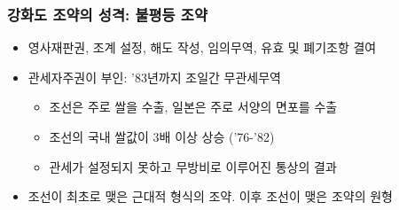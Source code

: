 \subsubsection*{강화도 조약의 성격: 불평등 조약}
\begin{itemize}
    \item 영사재판권, 조계 설정, 해도 작성, 임의무역, 유효 및 폐기조항 결여
    \item 관세자주권이 부인: '83년까지 조일간 무관세무역
    \begin{itemize}
        \item 조선은 주로 쌀을 수출, 일본은 주로 서양의 면포를 수출
        \item 조선의 국내 쌀값이 3배 이상 상승 ('76-'82)
        \item 관세가 설정되지 못하고 무방비로 이루어진 통상의 결과
    \end{itemize}
    \item 조선이 최초로 맺은 근대적 형식의 조약. 이후 조선이 맺은 조약의 원형
\end{itemize}
